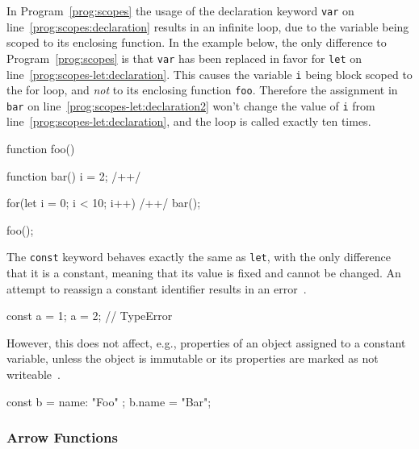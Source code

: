 \begin{program}
\caption{In Program~\ref{prog:scopes} the usage of the declaration keyword \texttt{var} on line~\ref{prog:scopes:declaration} results in an infinite loop, due to the variable being scoped to its enclosing function. In the example below, the only difference to Program~\ref{prog:scopes} is that \texttt{var} has been replaced in favor for \texttt{let} on line~\ref{prog:scopes-let:declaration}. This causes the variable \texttt{i} being block scoped to the for loop, and \emph{not} to its enclosing function \texttt{foo}. Therefore the assignment in \texttt{bar} on line~\ref{prog:scopes-let:declaration2} won't change the value of \texttt{i} from line~\ref{prog:scopes-let:declaration}, and the loop is called exactly ten times.}
\label{prog:scopes-let}
\begin{JsCode}
function foo() {

  function bar() {
    i = 2; /+\label{prog:scopes-let:declaration2}+/
  }
  
  for(let i = 0; i < 10; i++) { /+\label{prog:scopes-let:declaration}+/
    bar();
  }
  
}

foo();
\end{JsCode}
\end{program}

The \texttt{const} keyword behaves exactly the same as \texttt{let}, with the only difference that it is a constant, meaning that its value is fixed and cannot be changed. An attempt to reassign a constant identifier results in an error~\cite[p.~39]{YDKJS:ScopesAndClosures:Simpson:2014}.
\begin{JsCode}[numbers=none]
const a = 1;
a = 2; // TypeError
\end{JsCode}
However, this does not affect, e.g., properties of an object assigned to a constant variable, unless the object is immutable or its properties are marked as not writeable~\cite{const:MDN:2017}.
\begin{JsCode}[numbers=none]
const b = { name: "Foo" };
b.name = "Bar";
\end{JsCode}

\subsubsection{Arrow Functions}

